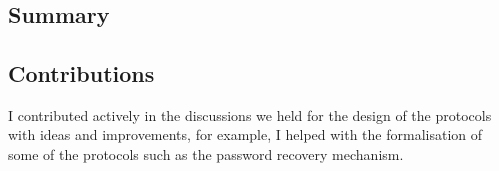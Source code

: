 

\section{}
\begingroup\centering
\begin{ppBox}
\end{ppBox}
\endgroup

\subsection{Summary}
    \label{subsection:summary-p2p}



\subsection{Contributions}
    \label{subsection:contributions-p2p}
I contributed actively in the discussions we held for the design of the protocols 
with ideas and improvements, for example, I helped with the formalisation of some 
of the protocols such as the password recovery mechanism. 


\section{}
\begingroup\centering
\begin{ppBox}
\end{ppBox}
\endgroup

